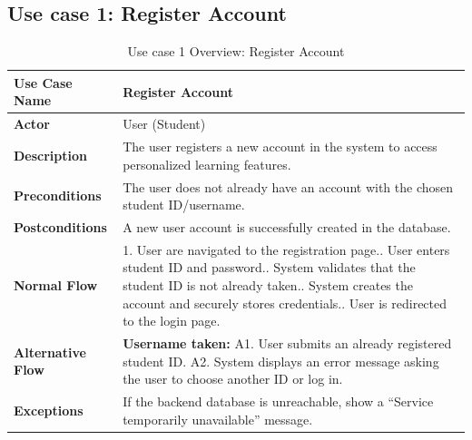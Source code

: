 \subsection{Use case 1: Register Account}
\begin{table}[H]
    \centering
    \renewcommand{\arraystretch}{1.5}
    \begin{tabularx}{\textwidth}{|l|X|}
        \hline
        \textbf{Use Case Name} & Register Account \\
        \hline
        \textbf{Actor} & User (Student) \\
        \hline
        \textbf{Description} & The user registers a new account in the system to access personalized learning features. \\
        \hline
        \textbf{Preconditions} & The user does not already have an account with the chosen student ID/username. \\
        \hline
        \textbf{Postconditions} & A new user account is successfully created in the database. \\
        \hline
        \textbf{Normal Flow} & 
        1. User are navigated to the registration page.\newline
        2. User enters student ID and password.\newline
        3. System validates that the student ID is not already taken.\newline
        4. System creates the account and securely stores credentials.\newline
        5. User is redirected to the login page. \\
        \hline
        \textbf{Alternative Flow} & 
        \textbf{Username taken:}\newline
        A1. User submits an already registered student ID.\newline
        A2. System displays an error message asking the user to choose another ID or log in. \\
        \hline
        \textbf{Exceptions} & If the backend database is unreachable, show a ``Service temporarily unavailable'' message. \\
        \hline
    \end{tabularx}
    \caption{Use case 1 Overview: Register Account}\label{tab:uc1}
\end{table}

